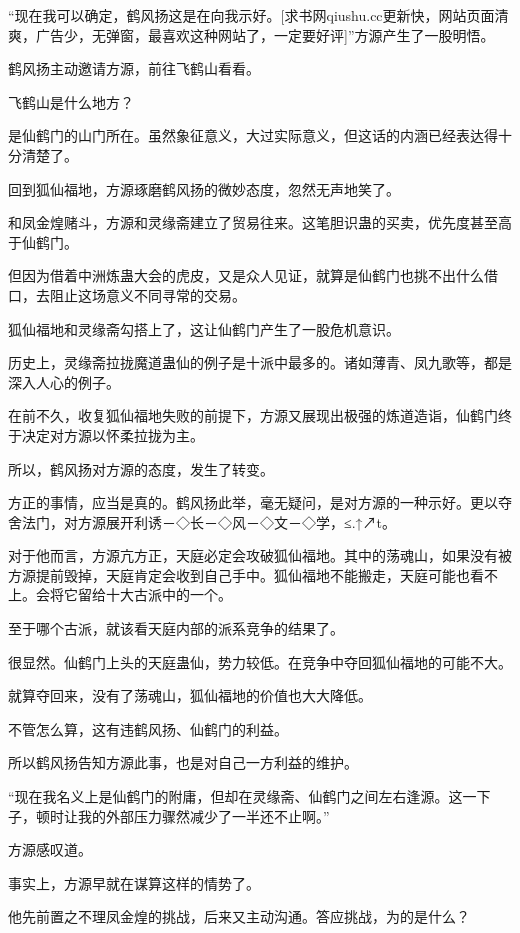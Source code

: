 
\begin{this_body}

“现在我可以确定，鹤风扬这是在向我示好。[求书网qiushu.cc更新快，网站页面清爽，广告少，无弹窗，最喜欢这种网站了，一定要好评]”方源产生了一股明悟。

鹤风扬主动邀请方源，前往飞鹤山看看。

飞鹤山是什么地方？

是仙鹤门的山门所在。虽然象征意义，大过实际意义，但这话的内涵已经表达得十分清楚了。

回到狐仙福地，方源琢磨鹤风扬的微妙态度，忽然无声地笑了。

和凤金煌赌斗，方源和灵缘斋建立了贸易往来。这笔胆识蛊的买卖，优先度甚至高于仙鹤门。

但因为借着中洲炼蛊大会的虎皮，又是众人见证，就算是仙鹤门也挑不出什么借口，去阻止这场意义不同寻常的交易。

狐仙福地和灵缘斋勾搭上了，这让仙鹤门产生了一股危机意识。

历史上，灵缘斋拉拢魔道蛊仙的例子是十派中最多的。诸如薄青、凤九歌等，都是深入人心的例子。

在前不久，收复狐仙福地失败的前提下，方源又展现出极强的炼道造诣，仙鹤门终于决定对方源以怀柔拉拢为主。

所以，鹤风扬对方源的态度，发生了转变。

方正的事情，应当是真的。鹤风扬此举，毫无疑问，是对方源的一种示好。更以夺舍法门，对方源展开利诱－◇长－◇风－◇文－◇学，≤.↑↗t。

对于他而言，方源亢方正，天庭必定会攻破狐仙福地。其中的荡魂山，如果没有被方源提前毁掉，天庭肯定会收到自己手中。狐仙福地不能搬走，天庭可能也看不上。会将它留给十大古派中的一个。

至于哪个古派，就该看天庭内部的派系竞争的结果了。

很显然。仙鹤门上头的天庭蛊仙，势力较低。在竞争中夺回狐仙福地的可能不大。

就算夺回来，没有了荡魂山，狐仙福地的价值也大大降低。

不管怎么算，这有违鹤风扬、仙鹤门的利益。

所以鹤风扬告知方源此事，也是对自己一方利益的维护。

“现在我名义上是仙鹤门的附庸，但却在灵缘斋、仙鹤门之间左右逢源。这一下子，顿时让我的外部压力骤然减少了一半还不止啊。”

方源感叹道。

事实上，方源早就在谋算这样的情势了。

他先前置之不理凤金煌的挑战，后来又主动沟通。答应挑战，为的是什么？


\end{this_body}
